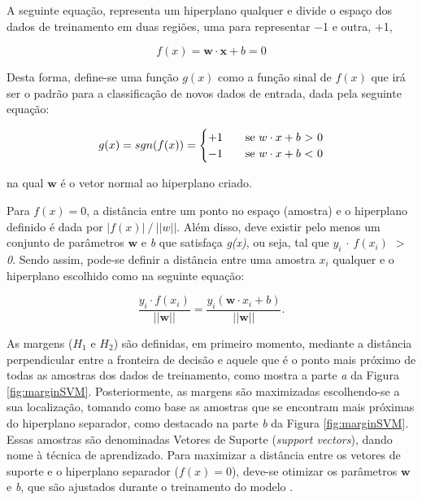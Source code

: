 A seguinte equação, representa um hiperplano qualquer e divide o espaço dos dados de treinamento em duas regiões, uma para representar $-$1 e outra, $+$1,

\begin{equation}
\label{eq:eqHiper}
 f(x)= \boldsymbol{w}\cdot \boldsymbol{x} + b = 0
\end{equation}


Desta forma, define-se uma função \textit{$g(x)$} como a função sinal de \textit{$f(x)$} que irá ser o padrão para a classificação de novos dados de entrada, dada pela seguinte equação:


\begin{equation}
\label{eq:eqSgn}
 g(x) = sgn(f(x)) =
   \begin{cases}
    +1       & \quad \text{se } w\cdot x + b \text{ } $>$ \text{ } 0\\
    -1  & \quad \text{se } w\cdot x + b \text{ } $<$ \text{ } 0\\
   \end{cases}
\end{equation}

na qual $\boldsymbol{w}$ é o vetor normal ao hiperplano criado.

Para $f(x) = 0$, a distância entre um ponto no espaço (amostra) e o hiperplano definido é dada por $|f(x)| \mathbin{/} ||w||$. Além disso, deve existir pelo menos um conjunto de parâmetros $\boldsymbol{w}$ e \textit{b} que satisfaça \textit{g(x)}, ou seja, tal que \textit{$y_i$ $\cdot$ $f(x_i)$ $>$ 0}. Sendo assim, pode-se definir a distância entre uma amostra $x_i$ qualquer e o hiperplano escolhido como na seguinte equação:

 \begin{equation}
\label{eq:eqDist}
  \frac{y_i \cdot f(x_i)}{||\boldsymbol{w}||} = \frac{y_i(\boldsymbol{w} \cdot x_i + b)}{||\boldsymbol{w}||}.
\end{equation}

As margens ($H_1$ e $H_2$) são definidas, em primeiro momento, mediante a distância perpendicular entre a fronteira de decisão e aquele que é o ponto mais próximo de todas as amostras dos dados de treinamento, como mostra a parte \textit{a} da Figura \ref{fig:marginSVM}. Posteriormente, as margens são maximizadas escolhendo-se a sua localização, tomando como base as amostras que se encontram mais próximas do hiperplano separador, como destacado na parte \textit{b} da Figura \ref{fig:marginSVM}. Essas amostras são denominadas Vetores de Suporte (\textit{support vectors}), dando nome à técnica de aprendizado. Para maximizar a distância entre os vetores de suporte e o hiperplano separador ($f(x) = 0$), deve-se otimizar os parâmetros $\boldsymbol{w}$ e \textit{b}, que são ajustados durante o treinamento do modelo .

